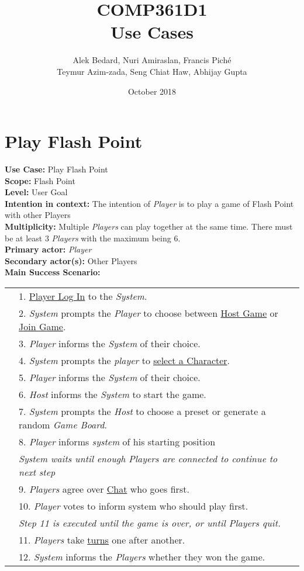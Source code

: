 \documentclass{article}
\title{COMP361D1\\Use Cases}
\author{Alek Bedard, Nuri Amiraslan, Francis Piché\\ Teymur Azim-zada, Seng Chiat Haw, Abhijay Gupta}
\date{October 2018}
\begin{document}
	\maketitle
	\section*{Play Flash Point}
	\textbf{Use Case: } Play Flash Point\\
	\textbf{Scope:} Flash Point\\
	\textbf{Level: }
	User Goal\\
	\textbf{Intention in context: }
	The intention of \textit{Player} is to play a game of Flash Point with other Players\\
	\textbf{Multiplicity: }
	Multiple \textit{Players} can play together at the same time. There must be at least 3 \textit{Players} with the maximum being 6.\\
	\textbf{Primary actor: }
	\textit{Player}\\
	\textbf{Secondary actor(s):} Other Players\\
	\textbf{Main Success Scenario:}\\
	\begin{tabular}{l l}
		&1. \underline{Player Log In} to the \textit{System}.\\
		&2. \textit{System} prompts the \textit{Player} to choose between \underline{Host Game} or \underline{Join Game}.\\
		&3. \textit{Player} informs the \textit{System} of their choice.\\
		&4. \textit{System} prompts the \textit{player} to \underline{select a Character}.\\
		&5. \textit{Player} informs the \textit{System} of their choice.\\
		&6. \textit{Host} informs the \textit{System} to start the game.\\
		&7. \textit{System} prompts the \textit{Host} to choose a preset or generate a random \textit{Game Board}.\\
		&8. \textit{Player} informs \textit{system} of his starting position\\
		&\qquad\textit{System waits until enough Players are connected to continue to next step}\\
		&9. \textit{Players} agree over \underline{Chat} who goes first.\\
		&10. \textit{Player} votes to inform system who should play first.\\
		&\qquad\textit{Step 11 is executed until the game is over, or until Players quit.}\\
		&11. \textit{Players} take \underline{turns} one after another.\\
		&12. \textit{System} informs the \textit{Players} whether they won the game.
	\end{tabular}\\
\end{document}
